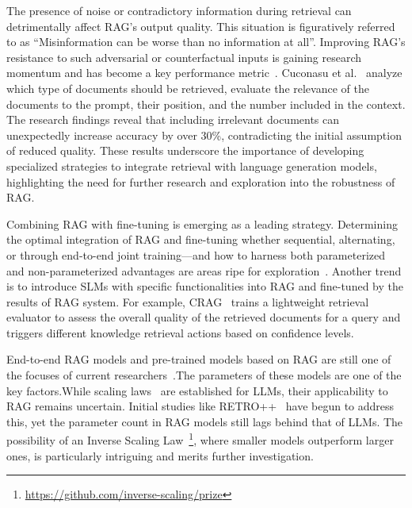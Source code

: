 The presence of noise or contradictory information during retrieval can detrimentally affect RAG's output quality. This situation is figuratively referred to as ``Misinformation can be worse than no information at all''. Improving RAG's resistance to such adversarial or counterfactual inputs is gaining research momentum and has become a key performance metric~. Cuconasu et al.~ analyze which type of documents should be retrieved, evaluate the relevance of the documents to the prompt, their position, and the number included in the context. The research findings reveal that including irrelevant documents can unexpectedly increase accuracy by over 30\%, contradicting the initial assumption of reduced quality. These results underscore the importance of developing specialized strategies to integrate retrieval with language generation models, highlighting the need for further research and exploration into the robustness of RAG.

Combining RAG with fine-tuning is emerging as a leading strategy. Determining the optimal integration of RAG and fine-tuning whether sequential, alternating, or through end-to-end joint training—and how to harness both parameterized and non-parameterized advantages are areas ripe for exploration~. Another trend is to introduce SLMs with specific functionalities into RAG and fine-tuned by the results of RAG system. For example, CRAG~ trains a lightweight retrieval evaluator to assess the overall quality of the retrieved documents for a query and triggers different knowledge retrieval actions based on confidence levels.

End-to-end RAG models and pre-trained models based on RAG are still one of the focuses of current researchers~.The parameters of these models are one of the key factors.While scaling laws~ are established for LLMs, their applicability to RAG remains uncertain. Initial studies like RETRO++~ have begun to address this, yet the parameter count in RAG models still lags behind that of LLMs. The possibility of an Inverse Scaling Law~\footnote{\url{https://github.com/inverse-scaling/prize}}, where smaller models outperform larger ones, is particularly intriguing and merits further investigation.

